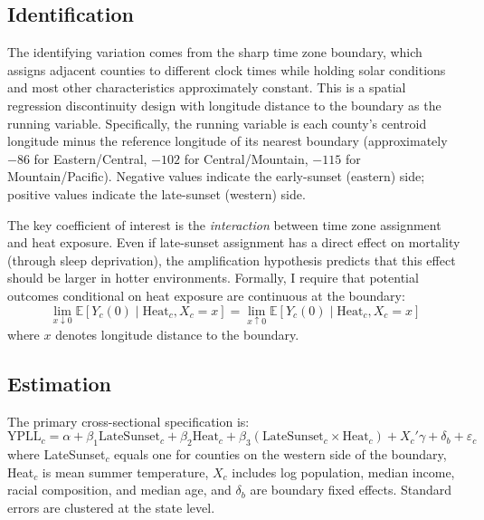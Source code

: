 \documentclass[12pt]{article}
\newcommand{\E}{\mathbb{E}}
\begin{document}
\subsection{Identification}

The identifying variation comes from the sharp time zone boundary, which assigns adjacent counties to different clock times while holding solar conditions and most other characteristics approximately constant. This is a spatial regression discontinuity design \citep{keele2015geographic, dell2010persistent} with longitude distance to the boundary as the running variable. Specifically, the running variable is each county's centroid longitude minus the reference longitude of its nearest boundary (approximately $-86$\textdegree{} for Eastern/Central, $-102$\textdegree{} for Central/Mountain, $-115$\textdegree{} for Mountain/Pacific). Negative values indicate the early-sunset (eastern) side; positive values indicate the late-sunset (western) side.

The key coefficient of interest is the \textit{interaction} between time zone assignment and heat exposure. Even if late-sunset assignment has a direct effect on mortality (through sleep deprivation), the amplification hypothesis predicts that this effect should be larger in hotter environments. Formally, I require that potential outcomes conditional on heat exposure are continuous at the boundary:
\begin{equation}
\lim_{x \downarrow 0} \E[Y_c(0) \mid \text{Heat}_c, X_c = x] = \lim_{x \uparrow 0} \E[Y_c(0) \mid \text{Heat}_c, X_c = x]
\end{equation}
where $x$ denotes longitude distance to the boundary.

\subsection{Estimation}

The primary cross-sectional specification is:
\begin{equation}
\text{YPLL}_c = \alpha + \beta_1 \text{LateSunset}_c + \beta_2 \text{Heat}_c + \beta_3 (\text{LateSunset}_c \times \text{Heat}_c) + X_c'\gamma + \delta_b + \varepsilon_c
\end{equation}
where LateSunset$_c$ equals one for counties on the western side of the boundary, Heat$_c$ is mean summer temperature, $X_c$ includes log population, median income, racial composition, and median age, and $\delta_b$ are boundary fixed effects. Standard errors are clustered at the state level.
\end{document}
